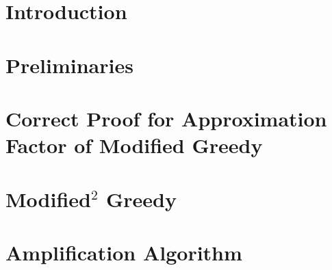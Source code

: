 \section{Introduction}

\section{Preliminaries}

\section{Correct Proof for Approximation Factor of Modified Greedy}

\section{\texorpdfstring{Modified$^2$ Greedy}{Modified\^{}2 Greedy}}


\section{Amplification Algorithm}
